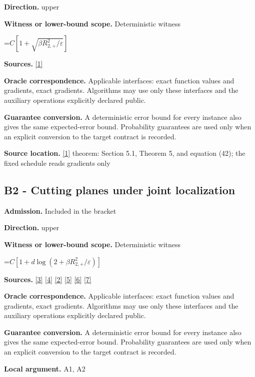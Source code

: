 \documentclass[10pt,a4paper]{article}
\newcommand{\AtlasMath}[1]{\par\begingroup\centering\setbox0=\hbox{$\displaystyle #1$}\ifdim\wd0>1.4\linewidth\typeout{ATLAS WIDE FORMULA: \the\wd0}\fi\ifdim\wd0>\linewidth\resizebox{\linewidth}{!}{\box0}\else\box0\fi\par\endgroup}
\begin{document}
\textbf{Direction.} upper

\textbf{Witness or lower-bound scope.} Deterministic witness

\AtlasMath{C[1+\sqrt{\beta R_{2,+}^2/\varepsilon}]}
\textbf{Sources.} \href{https://optimization-online.org/wp-content/uploads/2010/12/2865.pdf}{[1]}

\textbf{Oracle correspondence.} Applicable interfaces: exact function values and gradients, exact gradients. Algorithms may use only these interfaces and the auxiliary operations explicitly declared public.

\textbf{Guarantee conversion.} A deterministic error bound for every instance also gives the same expected-error bound. Probability guarantees are used only when an explicit conversion to the target contract is recorded.

\textbf{Source location.} \href{https://optimization-online.org/wp-content/uploads/2010/12/2865.pdf}{[1]} theorem: Section 5.1, Theorem 5, and equation (42); the fixed schedule reads gradients only

\subsection{B2 - Cutting planes under joint localization}
\textbf{Admission.} Included in the bracket

\textbf{Direction.} upper

\textbf{Witness or lower-bound scope.} Deterministic witness

\AtlasMath{C[1+d\log(2+\beta R_{2,+}^2/\varepsilon)]}
\textbf{Sources.} \href{https://arxiv.org/pdf/2101.09740v2}{[3]} \href{https://arxiv.org/pdf/2609.33360v2}{[4]} \href{https://arxiv.org/pdf/2609.10874}{[2]} \href{https://arxiv.org/pdf/1405.4980}{[5]} \href{https://www2.isye.gatech.edu/~nemirovs/MOR_AccuracyCertificates.pdf}{[6]} \href{https://arxiv.org/pdf/2609.20701}{[7]}

\textbf{Oracle correspondence.} Applicable interfaces: exact function values and gradients, exact gradients. Algorithms may use only these interfaces and the auxiliary operations explicitly declared public.

\textbf{Guarantee conversion.} A deterministic error bound for every instance also gives the same expected-error bound. Probability guarantees are used only when an explicit conversion to the target contract is recorded.

\textbf{Local argument.} A1, A2
\end{document}
